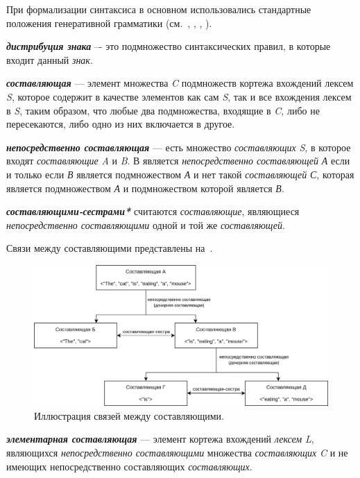 При формализации синтаксиса в основном использовались стандартные положения генеративной грамматики (см.~, , , ).

\textbf{\textit{дистрибуция знака}} –- это подмножество синтаксических правил, в которые входит данный \textit{знак}.

\textbf{\textit{составляющая}} --- элемент множества \textit{C} подмножеств кортежа вхождений лексем \textit{S}, которое содержит в качестве элементов как сам \textit{S}, так и все вхождения лексем в \textit{S}, таким образом, что любые два подмножества, входящие в \textit{C}, либо не пересекаются, либо одно из них включается в другое.

\textbf{\textit{непосредственно составляющая}} ---  есть множество \textit{составляющих} \textit{S}, в которое входят \textit{составляющие} \textit{A} и \textit{B}. В является \textit{непосредственно составляющей} \textit{А} если и только если \textit{В} является подмножеством \textit{А} и нет такой \textit{составляющей} \textit{С}, которая является подмножеством \textit{А} и подмножеством которой является \textit{В}.

\textbf{\textit{составляющими-сестрами*}} считаются \textit{составляющие}, являющиеся \textit{непосредственно составляющими} одной и той же \textit{составляющей}.

Связи между составляющими представлены на~\textit{}.

\begin{figure}[h]
    \centering
    \includegraphics[scale=0.15]{images/part2/chapter_lang/syntactic_example}
    \caption{Иллюстрация связей между составляющими.}
    \label{fig:syntactic_example}
\end{figure}

\textbf{\textit{элементарная составляющая}} --- элемент кортежа вхождений \textit{лексем} \textit{L}, являющихся \textit{непосредственно составляющими} множества \textit{составляющих} \textit{C} и не имеющих непосредственно составляющих \textit{составляющих}.

